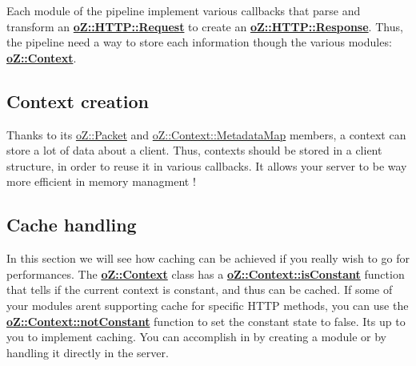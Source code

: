 Each module of the pipeline implement various callbacks that parse and transform an {\bfseries{\mbox{\hyperlink{classo_z_1_1_h_t_t_p_1_1_request}{o\+Z\+::\+H\+T\+T\+P\+::\+Request}}}} to create an {\bfseries{\mbox{\hyperlink{classo_z_1_1_h_t_t_p_1_1_response}{o\+Z\+::\+H\+T\+T\+P\+::\+Response}}}}. Thus, the pipeline need a way to store each information though the various modules\+: {\bfseries{\mbox{\hyperlink{classo_z_1_1_context}{o\+Z\+::\+Context}}}}.

\subsection*{Context creation}

Thanks to its \mbox{\hyperlink{classo_z_1_1_packet}{o\+Z\+::\+Packet}} and \mbox{\hyperlink{classo_z_1_1_context_a27f05cdc375f513979a6080896cf9496}{o\+Z\+::\+Context\+::\+Metadata\+Map}} members, a context can store a lot of data about a client. Thus, contexts should be stored in a client structure, in order to reuse it in various callbacks. It allows your server to be way more efficient in memory managment !


\begin{DoxyCode}{0}
\DoxyCodeLine{\{}
\DoxyCodeLine{\};}
\end{DoxyCode}


\subsection*{Cache handling}

In this section we will see how caching can be achieved if you really wish to go for performances. The {\bfseries{\mbox{\hyperlink{classo_z_1_1_context}{o\+Z\+::\+Context}}}} class has a {\bfseries{\mbox{\hyperlink{classo_z_1_1_context_a748147258019436983fdbbf6ed51c0b6}{o\+Z\+::\+Context\+::is\+Constant}}}} function that tells if the current context is constant, and thus can be cached. If some of your modules aren\textquotesingle{}t supporting cache for specific H\+T\+TP methods, you can use the {\bfseries{\mbox{\hyperlink{classo_z_1_1_context_ada521ec57fbc2febfd61177e8bbc0128}{o\+Z\+::\+Context\+::not\+Constant}}}} function to set the constant state to false. It\textquotesingle{}s up to you to implement caching. You can accomplish in by creating a module or by handling it directly in the server. 